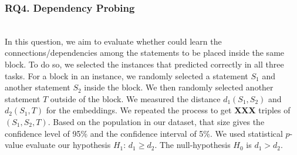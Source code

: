 \subsubsection{RQ4. Dependency Probing}~\\
In this question, we aim to evaluate whether {\tool} could learn the
connections/dependencies among the statements to be placed inside the
same  block. To do so, we selected the instances that
{\tool} predicted correctly in all three tasks. For a 
block in an instance, we randomly selected a statement $S_1$ and
another statement $S_2$ inside the block. We then randomly selected
another statement $T$ outside of the block. We measured the distance
$d_1(S_1,S_2)$ and $d_2(S_1,T)$ for the embeddings. We repeated the
process to get {\bf XXX} triples of $(S_1,S_2,T)$. Based on the
population in our dataset, that size gives the confidence level of
95\% and the confidence interval of 5\%. We used statistical $p$-value
evaluate our hypothesis $H_1$: $d_1 \geq d_2$. The null-hypothesis
$H_0$ is $d_1 > d_2$.



 
